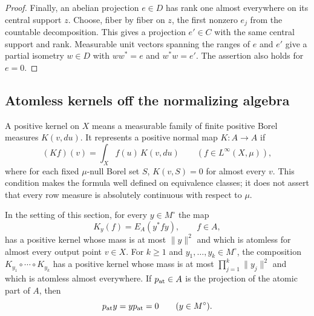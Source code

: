 \begin{proof}
Finally, an abelian projection $e\in D$ has rank one almost everywhere
on its central support $z$.  Choose, fiber by fiber on $z$, the first
nonzero $e_j$ from the countable decomposition.  This gives a
projection $e'\in C$ with the same central support and rank.  Measurable
unit vectors spanning the ranges of $e$ and $e'$ give a partial
isometry $w\in D$ with $ww^*=e$ and $w^*w=e'$.  The assertion also
holds for $e=0$.
\end{proof}

\subsection{Atomless kernels off the normalizing algebra}

A positive kernel on $X$ means a measurable family of finite positive
Borel measures $K(v,du)$.  It represents a positive normal map
$K\colon A\to A$ if
\[
 (Kf)(v)=\int_X f(u)\,K(v,du)
 \qquad(f\in L^\infty(X,\mu)),
\]
where for each fixed $\mu$-null Borel set $S$, $K(v,S)=0$ for almost
every $v$.  This condition makes the formula well defined on
equivalence classes; it does not assert that every row measure is
absolutely continuous with respect to $\mu$.

\begin{proposition}\label{prop:atomless-kernels}
In the setting of this section, for every $y\in M^\circ$ the map
\[
 K_y(f)=E_A(y^*fy),\qquad f\in A,
\]
has a positive kernel whose mass is at most $\|y\|^2$ and which is
atomless for almost every output point $v\in X$.
For $k\geq1$ and $y_1,\ldots,y_k\in M^\circ$, the composition
$K_{y_1}\circ\cdots\circ K_{y_k}$ has a positive kernel whose mass is at most
$\prod_{j=1}^k\|y_j\|^2$ and which is atomless almost everywhere.
If $p_{\rm at}\in A$ is the projection of
the atomic part of $A$, then
\[
 p_{\rm at}y=yp_{\rm at}=0\qquad(y\in M^\circ).
\]
\end{proposition}

